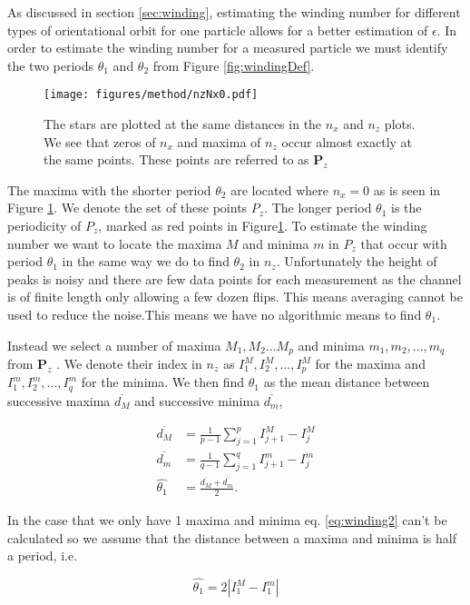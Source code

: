 	\label{sec:windingEstimation}
As discussed in section \ref{sec:winding}, estimating the winding number for different types of orientational orbit for one particle allows for a better estimation of $\epsilon$. In order to estimate the winding number for a measured 
particle we must identify the two periods $\theta_1$ and $\theta_2$ from Figure \ref{fig:windingDef}. 


\begin{figure}
\centering
\texttt{[image: figures/method/nzNx0.pdf]}
\caption{The stars are plotted at the same distances in the $n_x$ and $n_z$ plots. We see that zeros of $n_x$ and maxima of $n_z$ occur almost exactly at the same points. These points are referred to as $\mathbf{P}_z$}
\label{fig:nzNx0}
\end{figure}

The maxima with the shorter period $\theta_2$ are located where $n_x = 0$ as is seen in Figure \ref{fig:nzNx0}. We denote the set of these points $P_z$. The longer period $\theta_1$ is the periodicity of $P_z$, marked as red points in Figure\ref{fig:nzNx0}. To estimate the winding number we want to locate the maxima $M$ and minima $m$ in $P_z$ that occur with period $\theta_1$ in the same way we do to find $\theta_2$ in $n_z$. Unfortunately the height of peaks is noisy and there are few data points for each measurement as the channel is of finite length only allowing a few dozen flips. This means averaging cannot be used to reduce the noise.This means we have no algorithmic means to find $\theta_1$. 

Instead we select a number of maxima $M_1, M_2 ... M_p$ and minima $m_1, m_2, ..., m_q$ from $\mathbf{P}_z$ . We denote their index in $n_z$ as $I^M_1, I^M_2, 
..., I^M_p$ for the maxima and $I^m_1, I^m_2, ..., I^m_q$ for the minima. We then find $\theta_1$ as the mean distance between successive maxima $\overline{d_M}$ and successive minima $\overline{d_m}$, 

\begin{align}
\overline{d_M} &= \frac{1}{p-1} \sum\limits_{j=1}^{p} I^M_{j+1} - I^M_{j} \\
\overline{d_m} &= \frac{1}{q-1} \sum\limits_{j=1}^{q} I^m_{j+1}- I^m_{j}\\
\hat{\theta_1}   &= \frac{\overline{d_M} + \overline{d_m}}{2}.
\label{eq:winding2}
\end{align}

In the case that we only have 1 maxima and minima eq. \ref{eq:winding2} can't be calculated so we assume that the distance between a maxima and minima is half a period, i.e.

\begin{equation}
\hat{\theta_1} = 2\left| I^M_1 - I^m_1 \right|
\end{equation}